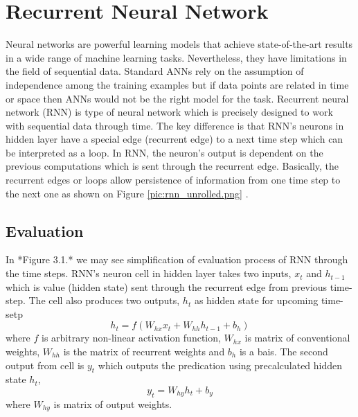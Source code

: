 \chapter{Recurrent Neural Network}

Neural networks are powerful learning models that achieve state-of-the-art results in a wide range of machine learning tasks.
Nevertheless, they have limitations in the field of sequential data.
Standard ANNs rely on the assumption of independence among the training examples but if data points are related in time or space then ANNs would not be the right model for the task\cite{critical_rnn}.
\newline
Recurrent neural network (RNN) is type of neural network which is precisely designed to work with sequential data through time.
The key difference is that RNN's neurons in hidden layer have a special edge (recurrent edge) to a next time step which can be interpreted as a loop.
In RNN, the neuron's output is dependent on the previous computations which is sent through the recurrent edge.
Basically, the recurrent edges or loops allow persistence of information from one time step to the next one as shown on Figure \ref{pic:rnn_unrolled.png} \cite{rnn_generation}.


\section{Evaluation}

In *Figure 3.1.* we may see simplification of evaluation process of RNN through the time steps.
RNN's neuron cell in hidden layer takes two inputs, $x_t$ and $h_{t-1}$ which is value (hidden state) sent through the recurrent edge from previous time-step.
The cell also produces two outputs, $h_t$ as hidden state for upcoming time-setp
\[ h_t = f(W_{hx}x_t + W_{hh}h_{t-1} + b_h) \]
where $f$ is arbitrary non-linear activation function, $W_{hx}$ is matrix of conventional weights, $W_{hh}$ is the matrix of recurrent weights and $b_h$ is a bais.
The second output from cell is $y_t$ which outputs the predication using precalculated hidden state $h_t$,
\[ y_t = W_{hy}h_t + b_y \]
where $W_{hy}$ is matrix of output weights.

